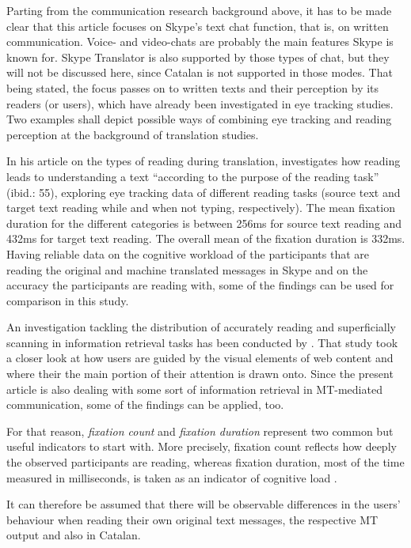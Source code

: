 \documentclass[output=paper]{langscibook}
\begin{document}
    Parting from the communication research background above, it has to be made clear that this article focuses on Skype's text chat function, that is, on written communication. Voice- and video-chats are probably the main features Skype is known for. Skype Translator is also supported by those types of chat, but they will not be discussed here, since Catalan is not supported in those modes. That being stated, the focus passes on to written texts and their perception by its readers (or users), which have already been investigated in eye tracking studies. Two examples shall depict possible ways of combining eye tracking and reading perception at the background of translation studies.
     
    In his article on the types of reading during translation, \cite[cf.][63]{jakobsen_chapter_2017} investigates how reading leads to understanding a text ``according to the purpose of the reading task'' (ibid.: 55), exploring eye tracking data of different reading tasks (source text and target text reading while and when not typing, respectively). The mean fixation duration for the different categories is between 256ms for source text reading and 432ms for target text reading. The overall mean of the fixation duration is 332ms. Having reliable data on the cognitive workload of the participants that are reading the original and machine translated messages in Skype and on the accuracy the participants are reading with, some of the findings can be used for comparison in this study.

    An investigation tackling the distribution of accurately reading and superficially scanning in information retrieval tasks has been conducted by \citet{bergstrom_chapter_2014}. That study took a closer look at how users are guided by the visual elements of web content and where their the main portion of their attention is drawn onto. Since the present article is also dealing with some sort of information retrieval in MT-mediated communication, some of the findings can be applied, too.

    For that reason, \textit{fixation count} and \textit{fixation duration} represent two common but useful indicators to start with. More precisely, fixation count reflects how deeply the observed participants are reading, whereas fixation duration, most of the time measured in milliseconds, is taken as an indicator of cognitive load \citep[cf.][63]{jakobsen_chapter_2017}.

    It can therefore be assumed that there will be observable differences in the users' behaviour when reading their own original text messages, the respective MT output and also in Catalan. 
    
\end{document}
